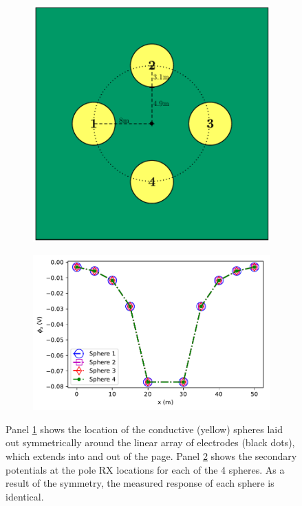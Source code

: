 \documentclass[preprint,authoryear,12pt]{elsarticle}
\begin{document}
\begin{figure}[htp]
   \begin{center}
      \begin{subfigure}{0.4\linewidth}
         \includegraphics[trim=0cm 0cm 0cm 0cm, clip=true,width=\linewidth]{./figures/Fig2a.pdf}
         \caption{}
         \label{fig:4Spheres_Symmetric_Model}
      \end{subfigure}
      \hfill
      \begin{subfigure}{0.59\linewidth}
         \includegraphics[trim=0cm 0cm 0cm 0cm, clip=true,width=\linewidth]{./figures/Fig2b.pdf}
         \caption{}
         \label{fig:4Spheres_Symmetric_Vs}
      \end{subfigure}
   \end{center}
\caption{Panel \ref{fig:4Spheres_Symmetric_Model} shows the location of the conductive (yellow) spheres laid out symmetrically around the linear array of electrodes (black dots), which extends into and out of the page. Panel \ref{fig:4Spheres_Symmetric_Vs} shows the secondary potentials at the pole RX locations for each of the 4 spheres. As a result of the symmetry, the measured response of each sphere is identical.}
\label{fig:4Spheres_Symmetric}
\end{figure}
\end{document}
